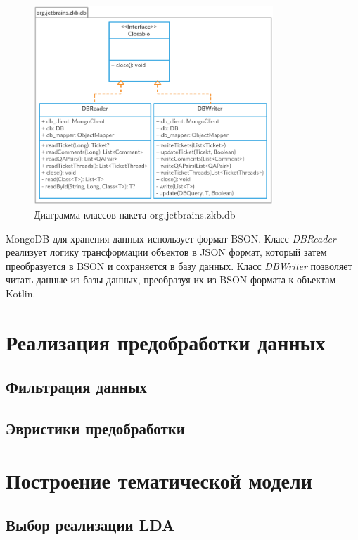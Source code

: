 \begin{figure}[tph!]
\centerline{\includegraphics[width=9cm]{fig/dbmodel.png}}
    \caption{Диаграмма классов пакета org.jetbrains.zkb.db}
    \label{fig:dbdmodel}
\end{figure}


MongoDB для хранения данных использует формат BSON. Класс \textit{DBReader} реализует логику трансформации объектов в JSON формат, который затем преобразуется в BSON и сохраняется в базу данных. Класс \textit{DBWriter} позволяет читать данные из базы данных, преобразуя их из BSON формата к объектам Kotlin.

\section{Реализация предобработки данных}
\subsection{Фильтрация данных}
\subsection{Эвристики предобработки}
\section{Построение тематической модели}
\subsection{Выбор реализации LDA}
\label{sec:lda_choose}
